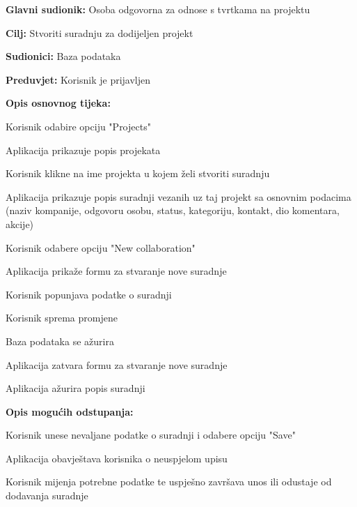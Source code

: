 					\noindent {}
					\begin{packed_item}

						\item \textbf{Glavni sudionik:} Osoba odgovorna za odnose s tvrtkama na projektu
						\item \textbf{Cilj:} Stvoriti suradnju za dodijeljen projekt
						\item \textbf{Sudionici:} Baza podataka
						\item \textbf{Preduvjet:} Korisnik je prijavljen
						\item \textbf{Opis osnovnog tijeka:}

						\item[] \begin{packed_enum}

							\item Korisnik odabire opciju "Projects"
							\item Aplikacija prikazuje popis projekata
							\item Korisnik klikne na ime projekta u kojem želi stvoriti suradnju
							\item Aplikacija prikazuje popis suradnji vezanih uz taj projekt sa osnovnim podacima (naziv kompanije, odgovoru osobu, status, kategoriju, kontakt, dio komentara, akcije)
							\item Korisnik odabere opciju "New collaboration"
							\item Aplikacija prikaže formu za stvaranje nove suradnje
							\item Korisnik popunjava podatke o suradnji
							\item Korisnik sprema promjene
							\item Baza podataka se ažurira
							\item Aplikacija zatvara formu za stvaranje nove suradnje
							\item Aplikacija ažurira popis suradnji
						\end{packed_enum}

						\item \textbf{Opis mogućih odstupanja:}

						\item[] \begin{packed_item}

							\item[8.c] Korisnik unese nevaljane podatke o suradnji i odabere opciju "Save"
							\item[] \begin{packed_enum}

								\item Aplikacija obavještava korisnika o neuspjelom upisu
								\item Korisnik mijenja potrebne podatke te uspješno završava unos ili
								odustaje od dodavanja suradnje

							\end{packed_enum}

						\end{packed_item}
					\end{packed_item}

